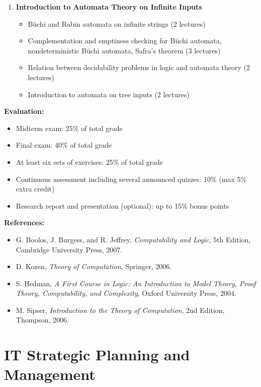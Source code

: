 \documentclass[12pt]{article}
\begin{document}
\begin{enumerate}
    \item \textbf{Introduction to Automata Theory on Infinite Inputs}
    \begin{itemize}
        \item Büchi and Rabin automata on infinite strings (2 lectures)
        \item Complementation and emptiness checking for Büchi automata, nondeterministic Büchi automata, Safra’s theorem (3 lectures)
        \item Relation between decidability problems in logic and automata theory (2 lectures)
        \item Introduction to automata on tree inputs (2 lectures)
    \end{itemize}
\end{enumerate}

\textbf{Evaluation:}
\begin{itemize}
    \item Midterm exam: 25\% of total grade
    \item Final exam: 40\% of total grade
    \item At least six sets of exercises: 25\% of total grade
    \item Continuous assessment including several announced quizzes: 10\% (max 5\% extra credit)
    \item Research report and presentation (optional): up to 15\% bonus points
\end{itemize}

\textbf{References:}
\begin{itemize}
    \item G. Boolos, J. Burgess, and R. Jeffrey, \textit{Computability and Logic}, 5th Edition, Cambridge University Press, 2007.
    \item D. Kozen, \textit{Theory of Computation}, Springer, 2006.
    \item S. Hedman, \textit{A First Course in Logic: An Introduction to Model Theory, Proof Theory, Computability, and Complexity}, Oxford University Press, 2004.
    \item M. Sipser, \textit{Introduction to the Theory of Computation}, 2nd Edition, Thompson, 2006.
\end{itemize}

\newpage

\section{IT Strategic Planning and Management}
\end{document}
